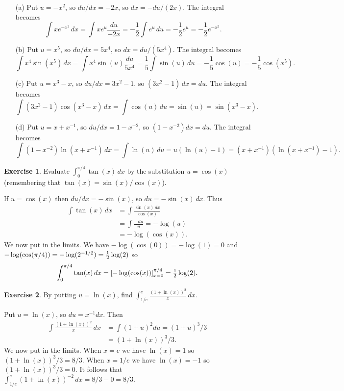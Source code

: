 \documentclass[a4paper]{amsart}
\theoremstyle{definition}
\newtheorem{exercise}{Exercise}[section]
\newenvironment{solution}{{\noindent \bf Solution:}}{}
\begin{document}
\begin{solution}
\begin{itemize}
  \item[(a)] Put $u=-x^2$, so $du/dx=-2x$, so
   $dx=-du/(2x)$.  The integral becomes 
   \[ \int x e^{-x^2}\,dx = 
      \int x e^u \frac{du}{-2x} = -\frac{1}{2}\int e^u\,du = 
      -\frac{1}{2}e^u = -\frac{1}{2}e^{-x^2}.
   \]
  \item[(b)] Put $u=x^5$, so $du/dx=5x^4$, so
   $dx=du/(5x^4)$.  The integral becomes
   \[ \int x^4\sin(x^5)\,dx = 
      \int x^4\sin(u)\frac{du}{5x^4} = 
      \frac{1}{5}\int \sin(u)\,du = -\frac{1}{5}\cos(u) =
      -\frac{1}{5}\cos(x^5).
   \]
  \item[(c)] Put $u=x^3-x$, so $du/dx=3x^2-1$, so
   $(3x^2-1)\,dx=du$.  The integral becomes
   \[ \int (3x^2-1)\cos(x^3-x)\,dx = 
      \int \cos(u)\,du = \sin(u) = \sin(x^3-x).
   \]
  \item[(d)] Put $u=x+x^{-1}$, so $du/dx=1-x^{-2}$, so
   $(1-x^{-2})dx=du$.  The integral becomes
   \[ \int (1-x^{-2})\ln(x+x^{-1})\,dx =
      \int \ln(u)\,du = u(\ln(u) - 1) =
      (x+x^{-1})(\ln(x+x^{-1})-1).
   \]
 \end{itemize}
\end{solution}
\begin{exercise}\label{ex-int-subs-ii}
 Evaluate $\displaystyle \int_0^{\pi/4}\tan(x)\,dx$ by the
 substitution $u=\cos(x)$ (remembering that
 $\tan(x)=\sin(x)/\cos(x)$).
\end{exercise}
\begin{solution}
If $u=\cos(x)$ then $du/dx=-\sin(x)$, so $du=-\sin(x)\,dx$.  Thus
 \begin{align*}
  \int\tan(x)\,dx &= \int\frac{\sin(x)\,dx}{\cos(x)} \\
                  &= \int\frac{-du}{u} = -\log(u) \\
                  &= -\log(\cos(x)).
 \end{align*}
 We now put in the limits.  We have $-\log(\cos(0))=-\log(1)=0$ and
 $-\log(\cos(\pi/4))=-\log(2^{-1/2})=\tfrac{1}{2}\log(2)$ so 
 \[ \int_0^{\pi/4}\tan(x)\,dx =
      \left[-\log(\cos(x))\right]_{x=0}^{\pi/4} = \tfrac{1}{2}\log(2).
 \]
\end{solution}
\begin{exercise}\label{ex-int-subs-iv}
 By putting $u=\ln(x)$, find
 $\displaystyle \int_{1/e}^e\frac{(1+\ln(x))^2}{x}\,dx$.
\end{exercise}
\begin{solution}
  Put $u=\ln(x)$, so $du=x^{-1}dx$.  Then
  \begin{align*}
   \int\frac{(1+\ln(x))^2}{x} \,dx &=
    \int (1+u)^2 du = (1+u)^3/3 \\
    &= (1+\ln(x))^3/3.
  \end{align*}
  We now put in the limits.  When $x=e$ we have $\ln(x)=1$ so
  $(1+\ln(x))^3/3=8/3$.  When $x=1/e$ we have $\ln(x)=-1$ so
  $(1+\ln(x))^3/3=0$.  It follows that 
  $\int_{1/e}^e (1+\ln(x))^{-2}\,dx=8/3-0=8/3$.
\end{solution}
\end{document}
